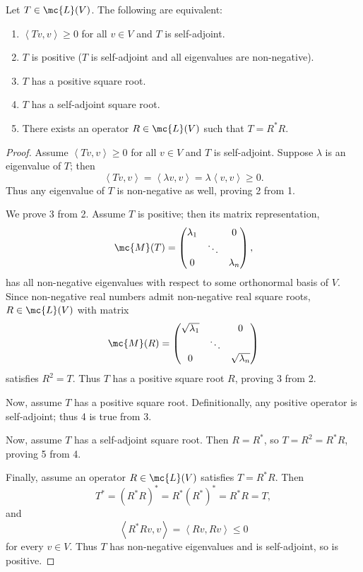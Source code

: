 \documentclass[math0540-lecture-notes.tex]{subfiles}
\begin{document}
\begin{proposition}{}
  Let $T\in \mc{L}(V)$. The following are equivalent:
  \begin{enumerate}
    \item $\left<Tv,v \right> \ge 0$ for all $v\in V$ and $T$ is self-adjoint.
    \item $T$ is positive ($T$ is self-adjoint and all eigenvalues are non-negative).
    \item $T$ has a positive square root.
    \item $T$ has a self-adjoint square root.
    \item There exists an operator $R\in \mc{L}(V)$ such that $T=R^*R$.
  \end{enumerate}
\end{proposition}
\begin{proof}[Proof]
  Assume $\left<Tv,v \right> \ge 0$ for all $v\in V$ and $T$ is self-adjoint. Suppose $\lambda$ is
  an eigenvalue of $T$; then \[
    \left<Tv,v \right> =\left<\lambda v,v \right> =\lambda \left<v,v \right> \ge 0
  .\] Thus any eigenvalue of $T$ is non-negative as well, proving 2 from 1.

  We prove 3 from 2. Assume $T$ is positive; then its matrix
  representation, \[
    \mc{M}(T)=\begin{pmatrix} \lambda_1&&0\\&\ddots&\\0&&\lambda_n \end{pmatrix} 
  ,\] has all non-negative eigenvalues with respect to some orthonormal basis of $V$. Since
  non-negative real numbers admit non-negative real square roots, $R\in \mc{L}(V)$ with matrix \[
    \mc{M}(R)=\begin{pmatrix} \sqrt{\lambda_1}&&0\\&\ddots&\\0&&\sqrt{\lambda_n} \end{pmatrix} 
  \] satisfies $R^2=T$. Thus $T$ has a positive square root $R$, proving 3 from 2.

  Now, assume $T$ has a positive square root. Definitionally, any positive operator is self-adjoint;
  thus 4 is true from 3.

  Now, assume $T$ has a self-adjoint square root. Then $R=R^*$, so $T=R^2=R^*R$, proving 5 from 4.

  Finally, assume an operator $R\in \mc{L}(V)$ satisfies $T=R^*R$. Then \[
    T^*=(R^*R)^*=R^*(R^*)^*=R^*R=T
  ,\] and \[
    \left<R^*Rv,v \right> =\left<Rv,Rv \right> \le 0
  \] for every $v\in V$. Thus $T$ has non-negative eigenvalues and is self-adjoint, so is positive.
\end{proof}
\end{document}
